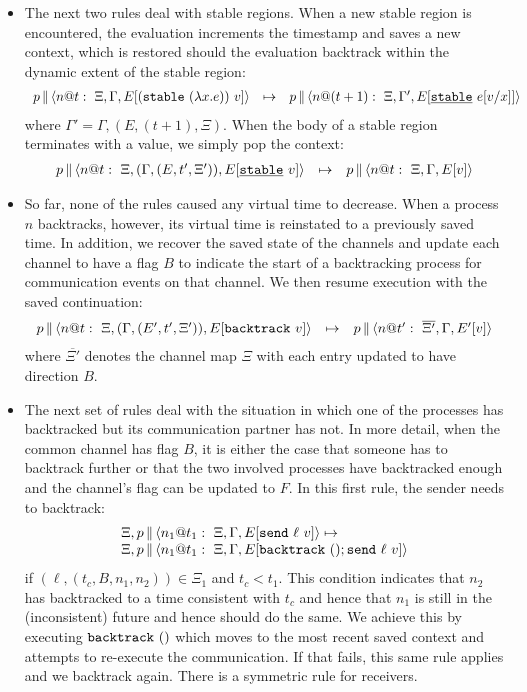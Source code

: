 \documentclass{article}
\begin{document}
\begin{itemize}
\item The next two rules deal with stable regions. When a new stable region
  is encountered, the evaluation increments the timestamp and saves a new
  context, which is restored should the evaluation backtrack within the
  dynamic extent of the stable region:
\[\begin{array}{rcl}
  \parc{p}{\proc{n}{\Gamma}{\Xi}{E[(\stable{(\lambda x.e)})~v]}{t}} &\mapsto&
  \parc{p}{\proc{n}{\Gamma'}{\Xi}{E[\stableu{e[v/x]}]}{(t+1)}} 
\end{array}\]
where $\Gamma' = \Gamma,(E,(t+1),\Xi)$. When the body of a stable 
region terminates with a value, we simply pop the context:
\[\begin{array}{rcl}
  \parc{p}{\proc{n}{(\Gamma,(E,t',\Xi'))}{\Xi}{E[\stableu{v}]}{t}} 
  &\mapsto& 
  \parc{p}{\proc{n}{\Gamma}{\Xi}{E[v]}{t}} 
\end{array}\]

\item So far, none of the rules caused any virtual time to decrease. When a
  process $n$ backtracks, however, its virtual time is reinstated to a
  previously saved time. In addition, we recover the saved state of the
  channels and update each channel to have a flag $B$ to indicate the start
  of a backtracking process for communication events on that channel.  We
  then resume execution with the saved continuation:
\[\begin{array}{rcl}
  \parc{p}{\proc{n}{(\Gamma,(E',t',\Xi'))}{\Xi}{E[\backtrack{v}]}{t}} 
  &\mapsto& 
  \parc{p}{\proc{n}{\Gamma}{\overline{\Xi'}}{E'[v]}{t'}} 
\end{array}\]
where $\overline{\Xi'}$ denotes the channel map $\Xi$ with each entry updated
to have direction $B$.

\item The next set of rules deal with the situation in which one of the
  processes has backtracked but its communication partner has not. In more
  detail, when the common channel has flag $B$, it is either the case that
  someone has to backtrack further or that the two involved processes have
  backtracked enough and the channel's flag can be updated to $F$. In this
  first rule, the sender needs to backtrack:
\[\begin{array}{l}
  \Xi,
  \parc{p}{\proc{n_1}{\Gamma}{\Xi}{E[\send{\ell}{v}]}{t_1}} \mapsto \\
  \Xi,
  \parc{p}{\proc{n_1}{\Gamma}{\Xi}{E[\backtrack{()}; \send{\ell}{v}]}{t_1}}
\end{array}\]
if $(\ell,(t_c,B,n_1,n_2)) \in \Xi_1$ and $t_c < t_1$. This condition
indicates that $n_2$ has backtracked to a time consistent with $t_c$ and
hence that $n_1$ is still in the (inconsistent) future and hence should do
the same. We achieve this by executing $\backtrack{()}$ which moves to the
most recent saved context and attempts to re-execute the communication.  If
that fails, this same rule applies and we backtrack again.  There is a
symmetric rule for receivers.


\end{itemize}
\end{document}
